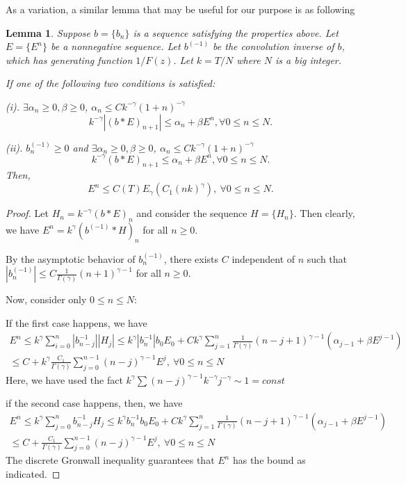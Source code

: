\documentclass[11pt]{article}
\newtheorem{lmm}{Lemma}
\begin{document}
As a variation, a similar lemma that may be useful for our purpose is as following
\begin{lmm}
Suppose $b=\{b_n\}$ is a sequence satisfying the properties above. Let $E=\{E^n\}$ be a nonnegative sequence. Let $b^{(-1)}$ be the convolution inverse of $b$, which has generating function $1/F(z)$. Let $k=T/N$ where $N$ is a big integer.

If one of the following two conditions is satisfied:

 (i). $\exists \alpha_n\ge 0,\beta\ge 0$, $\alpha_n\le Ck^{-\gamma}(1+n)^{-\gamma}$
 $$
k^{-\gamma}|(b*E)_{n+1}|\le \alpha_n+\beta E^n,\forall 0\le n\le N.
$$

(ii). $b^{(-1)}_n\ge 0$ and $\exists \alpha_n\ge0, \beta\ge0$, $\alpha_n\le Ck^{-\gamma}(1+n)^{-\gamma}$
$$
k^{-\gamma}(b*E)_{n+1}\le \alpha_n+\beta E^n,\forall 0\le n\le N.
$$
Then, $$
E^n\le C(T)E_{\gamma}(C_1(nk)^{\gamma}),\ \forall 0\le n\le N.
$$
\end{lmm}
\begin{proof}
Let $H_n=k^{-\gamma}(b*E)_{n}$ and consider the sequence $H=\{H_n\}$. Then clearly, we have $E^n=k^{\gamma}(b^{(-1)}*H)_n$ for all $n\ge 0$.

By the asymptotic behavior of $b^{(-1)}_n$, there exists $C$ independent of $n$ such that $|b^{(-1)}_n|\le C \frac{1}{\Gamma(\gamma)}(n+1)^{\gamma-1}$ for all $n\ge 0$.

Now, consider only $0\le n\le N$:

If the first case happens, we have 
\begin{gather*}
E^n\le k^{\gamma}\sum_{i=0}^n |b_{n-j}^{-1}| |H_{j}|
\le k^{\gamma}|b_n^{-1}|b_0E_0+Ck^{\gamma}\sum_{j=1}^{n} \frac{1}{\Gamma(\gamma)}(n-j+1)^{\gamma-1}
(\alpha_{j-1}+\beta E^{j-1})\\
\le C+k^{\gamma}\frac{C_1}{\Gamma(\gamma)}\sum_{j=0}^{n-1}(n-j)^{\gamma-1}E^j,\ \forall 0\le n\le N
\end{gather*}
Here, we have used the fact $k^{\gamma}\sum (n-j)^{\gamma-1}k^{-\gamma}j^{-\gamma}\sim 1=const$

if the second case happens, then, we have 
\begin{gather*}
E^n\le k^{\gamma}\sum_{j=0}^n b_{n-j}^{-1} H_{j}
\le k^{\gamma}b_n^{-1}b_0E_0+Ck^{\gamma}\sum_{j=1}^{n} \frac{1}{\Gamma(\gamma)}(n-j+1)^{\gamma-1}
(\alpha_{j-1}+\beta E^{j-1})\\
\le C+\frac{C_1}{\Gamma(\gamma)}\sum_{j=0}^{n-1}(n-j)^{\gamma-1}E^j,\ \forall 0\le n\le N
\end{gather*}
The discrete Gronwall inequality guarantees that $E^n$ has the bound as indicated.
\end{proof}
\end{document}
